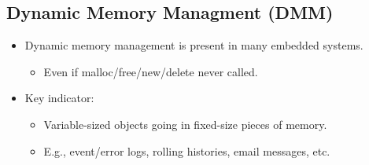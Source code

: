 \subsection{Dynamic Memory Managment (DMM)}
\begin{itemize}
  \item Dynamic memory management is present in many embedded systems.
  \begin{itemize}
    \item Even if malloc/free/new/delete never called.
  \end{itemize}
  \item Key indicator:
  \begin{itemize}
    \item Variable-sized objects going in fixed-size pieces of memory.
    \item E.g., event/error logs, rolling histories, email messages, etc.
  \end{itemize}
\end{itemize}

